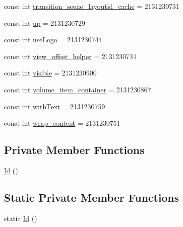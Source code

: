 \begin{DoxyCompactItemize}
\item 
const int \mbox{\hyperlink{class_f_w_p_s___app_1_1_droid_1_1_resource_1_1_id_a55e076951e2bbe8cd386f1e138c9c581}{transition\+\_\+scene\+\_\+layoutid\+\_\+cache}} = 2131230731
\item 
const int \mbox{\hyperlink{class_f_w_p_s___app_1_1_droid_1_1_resource_1_1_id_ad0e45f3fc3e884e6613756280f9b426a}{up}} = 2131230729
\item 
const int \mbox{\hyperlink{class_f_w_p_s___app_1_1_droid_1_1_resource_1_1_id_af442b057eb8a66b76ea24d0ad7fd27f1}{use\+Logo}} = 2131230744
\item 
const int \mbox{\hyperlink{class_f_w_p_s___app_1_1_droid_1_1_resource_1_1_id_a174e07bfd6721a613ed6ae31cfe338d3}{view\+\_\+offset\+\_\+helper}} = 2131230734
\item 
const int \mbox{\hyperlink{class_f_w_p_s___app_1_1_droid_1_1_resource_1_1_id_a6c22436433289a85bba354e0936b6256}{visible}} = 2131230900
\item 
const int \mbox{\hyperlink{class_f_w_p_s___app_1_1_droid_1_1_resource_1_1_id_abc2962ed43b6e4de187d2fc815a6447f}{volume\+\_\+item\+\_\+container}} = 2131230867
\item 
const int \mbox{\hyperlink{class_f_w_p_s___app_1_1_droid_1_1_resource_1_1_id_aa78fb6bb53f2be2656448fb43c12bdca}{with\+Text}} = 2131230759
\item 
const int \mbox{\hyperlink{class_f_w_p_s___app_1_1_droid_1_1_resource_1_1_id_aa631c106661ca56ff0ecb0ecaca9d226}{wrap\+\_\+content}} = 2131230751
\end{DoxyCompactItemize}
\subsection*{Private Member Functions}
\begin{DoxyCompactItemize}
\item 
\mbox{\hyperlink{class_f_w_p_s___app_1_1_droid_1_1_resource_1_1_id_ace20ecc8cce5d2af3c43ed9da5fd358a}{Id}} ()
\end{DoxyCompactItemize}
\subsection*{Static Private Member Functions}
\begin{DoxyCompactItemize}
\item 
static \mbox{\hyperlink{class_f_w_p_s___app_1_1_droid_1_1_resource_1_1_id_a7308f64c41872f26a1b59b8442f95a16}{Id}} ()
\end{DoxyCompactItemize}



